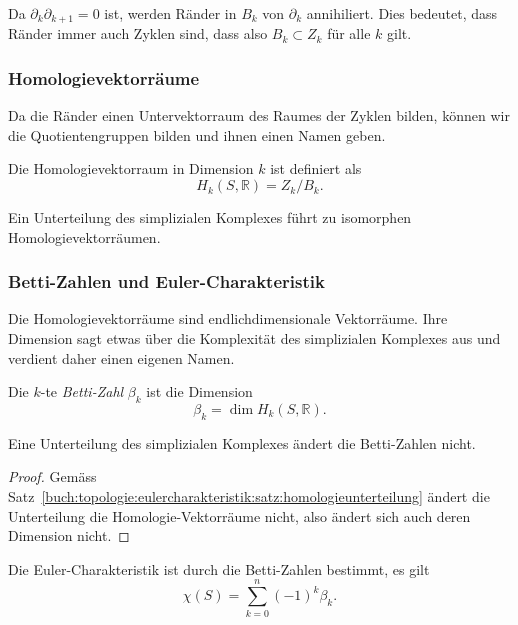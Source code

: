 Da $\partial_{k}\partial_{k+1}=0$ ist, werden Ränder in $B_k$
von $\partial_k$ annihiliert.
Dies bedeutet, dass Ränder immer auch Zyklen sind, dass also
$B_k\subset Z_k$ für alle $k$ gilt.

%
%
\subsubsection{Homologievektorräume}
Da die Ränder einen Untervektorraum des Raumes der Zyklen bilden,
können wir die Quotientengruppen bilden und ihnen einen Namen geben.

\begin{definition}[Homologievektorraum]
Die Homologievektorraum in Dimension $k$ ist definiert als
\[
H_k(S,\mathbb{R})
=
Z_k / B_k.
\]
\end{definition}

\begin{satz}
\label{buch:topologie:eulercharakteristik:satz:homologieunterteilung}
Ein Unterteilung des simplizialen Komplexes führt zu isomorphen
Homologievektorräumen.
\end{satz}

\subsubsection{Betti-Zahlen und Euler-Charakteristik}
Die Homologievektorräume sind endlichdimensionale Vektorräume.
Ihre Dimension sagt etwas über die Komplexität des simplizialen
Komplexes aus und verdient daher einen eigenen Namen.

\begin{definition}
Die $k$-te \emph{Betti-Zahl} $\beta_k$ ist die Dimension
\[
\beta_k
=
\dim H_k(S,\mathbb{R}).
\]
\end{definition}

\begin{satz}
Eine Unterteilung des simplizialen Komplexes ändert die Betti-Zahlen
nicht.
\end{satz}

\begin{proof}
Gemäss Satz~\ref{buch:topologie:eulercharakteristik:satz:homologieunterteilung}
ändert die Unterteilung die Homologie-Vektorräume nicht, also ändert sich
auch deren Dimension nicht.
\end{proof}

\begin{satz}
Die Euler-Charakteristik ist durch die Betti-Zahlen bestimmt,
es gilt
\[
\chi(S)
=
\sum_{k=0}^n (-1)^k \beta_k.
\]
\end{satz}

